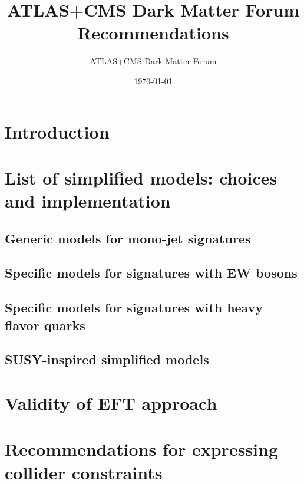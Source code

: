 \documentclass[a4,debug,notitlepage,nobib]{tufte-book}
\title{ATLAS+CMS Dark Matter Forum Recommendations}
\author{ATLAS+CMS Dark Matter Forum}
\date{\today}
\newcommand{\blankpage}{\newpage\hbox{}\thispagestyle{empty}\newpage}
\begin{document}
\morefloats
\setcounter{secnumdepth}{2} %



\blankpage

\chapter{Introduction}
\label{sec:Introduction}


\chapter{List of simplified models: choices and implementation}
\label{sec:SimplifiedModelsIntro} 


\section{Generic models for mono-jet signatures}
\label{subsec:MonojetLikeModels}


\section{Specific models for signatures with EW bosons}
\label{subsec:EWSpecificModels}


\section{Specific models for signatures with heavy flavor quarks}
\label{subsec:DMHFModels}


\section{SUSY-inspired simplified models}
\label{subsec:SUSYModels}


\chapter{Validity of EFT approach}
\label{sec:EFTValidity} 


\chapter{Recommendations for expressing collider constraints}
\label{sec:ColliderConstraints} 




\end{document}
